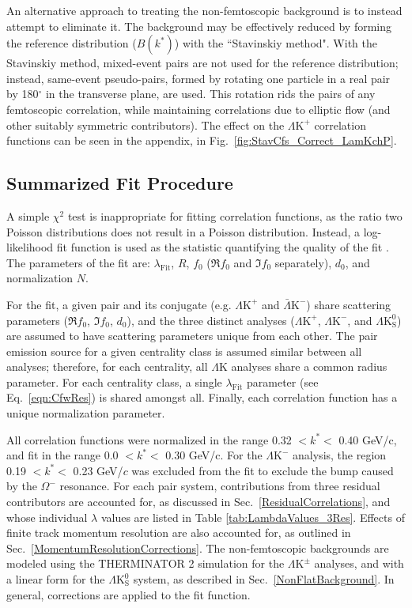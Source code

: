 \documentclass[ALICE,manyauthors]{cernphprep}
\newcommand{\LamK}{$\Lambda$K\xspace}
\newcommand{\LamKchP}{$\Lambda\mathrm{K^{+}}$\xspace}
\newcommand{\ALamKchM}{$\bar{\Lambda}\mathrm{K^{-}}$\xspace}
\newcommand{\LamKchM}{$\Lambda\mathrm{K^{-}}$\xspace}
\newcommand{\LamKpm}{$\Lambda\mathrm{K^{\pm}}$\xspace}
\newcommand{\LamKs}{$\Lambda\mathrm{K^{0}_{S}}$\xspace}
\begin{document}
An alternative approach to treating the non-femtoscopic background is to instead attempt to eliminate it.
The background may be effectively reduced by forming the reference distribution ($B(k^{*})$) with the ``Stavinskiy method".
With the Stavinskiy method, mixed-event pairs are not used for the reference distribution; instead, same-event pseudo-pairs, formed by rotating one particle in a real pair by 180$^\circ$ in the transverse plane, are used.  
This rotation rids the pairs of any femtoscopic correlation, while maintaining correlations due to elliptic flow (and other suitably symmetric contributors).
The effect on the \LamKchP correlation functions can be seen in the appendix, in Fig.\ \ref{fig:StavCfs_Correct_LamKchP}.


\subsection{Summarized Fit Procedure}
\label{SummarizedFitProcedure}


A simple $\chi^{2}$ test is inappropriate for fitting correlation functions, as the ratio two Poisson distributions does not result in a Poisson distribution.
Instead, a log-likelihood fit function is used as the statistic quantifying the quality of the fit \cite{Lisa:2005dd}.
The parameters of the fit are: $\lambda_{\mathrm{Fit}}$, $R$, $f_{0}$ ($\Re f_{0}$ and $\Im f_{0}$ separately), $d_{0}$, and normalization $N$.

For the fit, a given pair and its conjugate (e.g. \LamKchP and \ALamKchM) share scattering parameters ($\Re f_{0}$, $\Im f_{0}$, $d_{0}$), and the three distinct analyses (\LamKchP, \LamKchM, and \LamKs) are assumed to have scattering parameters unique from each other.
The pair emission source for a given centrality class is assumed similar between all analyses; therefore, for each centrality, all \LamK analyses share a common radius parameter.
For each centrality class, a single $\lambda_{\mathrm{Fit}}$ parameter (see Eq.\ \ref{eqn:CfwRes}) is shared amongst all.
Finally, each correlation function has a unique normalization parameter.

All correlation functions were normalized in the range 0.32 $< k^{*} <$ 0.40 GeV/c, and fit in the range 0.0 $< k^{*} <$ 0.30 GeV/c.
For the \LamKchM analysis, the region 0.19 $< k^{*} <$ 0.23 GeV/$c$ was excluded from the fit to exclude the bump caused by the $\Omega^{-}$ resonance.
For each pair system, contributions from three residual contributors are accounted for, as discussed in Sec.\ \ref{ResidualCorrelations}, and whose individual $\lambda$ values are listed in Table \ref{tab:LambdaValues_3Res}.
Effects of finite track momentum resolution are also accounted for, as outlined in Sec.\ \ref{MomentumResolutionCorrections}.
The non-femtoscopic backgrounds are modeled using the THERMINATOR 2 simulation for the \LamKpm analyses, and with a linear form for the \LamKs system, as described in Sec.\ \ref{NonFlatBackground}.
In general, corrections are applied to the fit function.
\end{document}
